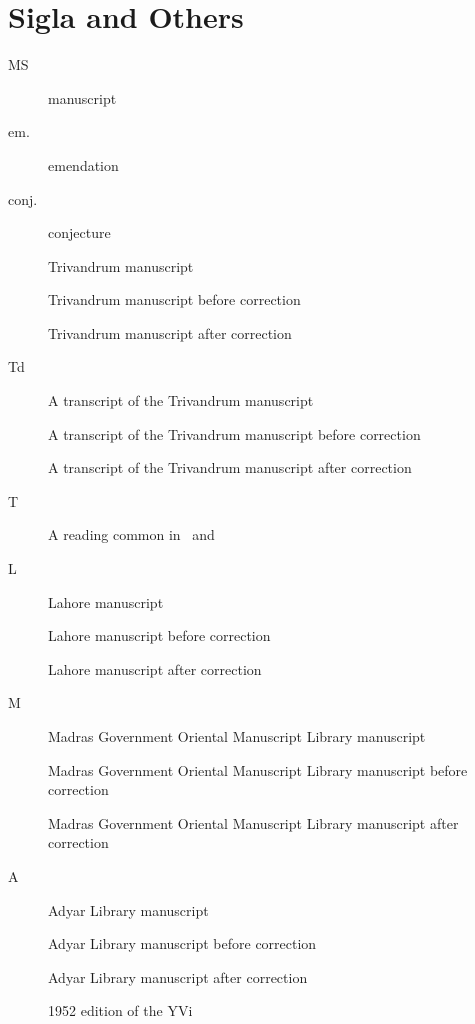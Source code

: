 \section{Sigla and Others}
\begin{description}
	\item[MS]{manuscript}
	\item[em.]{emendation}
	\item[conj.]{conjecture}
	\item[\Tm]{Trivandrum manuscript}
	\item[\Tmac]{Trivandrum manuscript before correction}
	\item[\Tmpc]{Trivandrum manuscript after correction}
	\item[Td]{A transcript of the Trivandrum manuscript}
	\item[\Tdac]{A transcript of the Trivandrum manuscript before correction}
	\item[\Tdpc]{A transcript of the Trivandrum manuscript after correction}
	\item[T]{A reading common in \Tm\ and \Td}
	\item[L]{Lahore manuscript}
	\item[\Lac]{Lahore manuscript before correction}
	\item[\Lpc]{Lahore manuscript after correction}
	\item[M]{Madras Government Oriental Manuscript Library manuscript}
	\item[\Mac]{Madras Government Oriental Manuscript Library manuscript before correction}
	\item[\Mpc]{Madras Government Oriental Manuscript Library manuscript after correction}
	\item[A]{Adyar Library manuscript}
	\item[\Aac]{Adyar Library manuscript before correction}
	\item[\Apc]{Adyar Library manuscript after correction}
	\item[\Me]{1952 edition of the YVi}
\end{description}